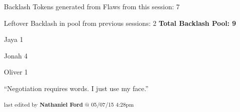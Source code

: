 Backlash Tokens generated from Flaws from this session: 7

Leftover Backlash in pool from previous sessions: 2
\textbf{Total Backlash Pool: 9}


Jaya 1

Jonah 4

Oliver 1



``Negotiation requires words.  I just use my face.''




\vspace{\fill}

\begin{flushright}
\textsubscript{last edited by \textbf{Nathaniel Ford} @ 05/07/15 4:28pm}
\end{flushright}

